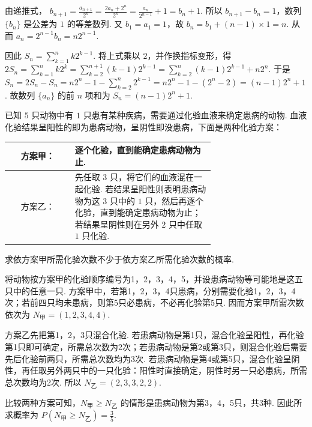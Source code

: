 \begin{solution}
由递推式，
\(
b_{n+1}=\frac{a_{n+1}}{2^n}=\frac{2a_n+2^n}{2^n}=\frac{a_n}{2^{n-1}}+1=b_n+1
\).
所以 \(b_{n+1}-b_n=1\)，数列 \(\{b_n\}\) 是公差为 \(1\) 的等差数列. 又 \(b_1=a_1=1\)，故
\(
b_n=b_1+(n-1)\times1=n
\).
从而
\(
a_n=2^{n-1}b_n=n2^{n-1}
\).

因此
\(
S_n=\sum_{k=1}^{n}k2^{k-1}
\).
将上式乘以 \(2\)，并作换指标变形，得
\(
2S_n=\sum_{k=1}^{n}k2^k=\sum_{k=2}^{n+1}(k-1)2^{k-1}=\sum_{k=2}^{n}(k-1)2^{k-1}+n2^n
\).
于是
\(
S_n=2S_n-S_n=n2^n-1-\sum_{k=2}^{n}2^{k-1}=n2^n-1-(2^n-2)=(n-1)2^n+1
\).
故数列 \(\{a_n\}\) 的前 \(n\) 项和为 \(S_n=(n-1)2^n+1\).
\end{solution}

\begin{problem}
已知 \(5\text{ 只}\)动物中有 \(1\text{ 只}\)患有某种疾病，需要通过化验血液来确定患病的动物. 血液化验结果呈阳性的即为患病动物，呈阴性即没患病，下面是两种化验方案：

\begin{center}
\begin{tabular}{|c|p{0.68\linewidth}|}
\hline
方案甲： & 逐个化验，直到能确定患病动物为止. \\
\hline
方案乙： & 先任取 \(3\text{ 只}\)，将它们的血液混在一起化验. 若结果呈阳性则表明患病动物为这 \(3\text{ 只}\)中的 \(1\text{ 只}\)，然后再逐个化验，直到能确定患病动物为止；若结果呈阴性则在另外 \(2\text{ 只}\)中任取 \(1\text{ 只}\)化验. \\
\hline
\end{tabular}
\end{center}

求依方案甲所需化验次数不少于依方案乙所需化验次数的概率.
\end{problem}

\begin{solution}
将动物按方案甲的化验顺序编号为1，2，3，4，5，并设患病动物等可能地是这五只中的任意一只. 方案甲中，若第1，2，3，4只患病，分别需要化验1，2，3，4次；若前四只均未患病，则第5只必患病，不必再化验第5只. 因而方案甲所需次数依次为
\(
N_{\text{甲}}=(1,2,3,4,4)
\).

方案乙先把第1，2，3只混合化验. 若患病动物是第1只，混合化验呈阳性，再化验第1只即可确定，所需总次数为2次；若患病动物是第2或第3只，则混合化验后需要先后化验前两只，所需总次数均为3次. 若患病动物是第4或第5只，混合化验呈阴性，再任取另外两只中的一只化验：阳性时直接确定，阴性时另一只必患病，所需总次数均为2次. 所以
\(
N_{\text{乙}}=(2,3,3,2,2)
\).

比较两种方案可知，\(N_{\text{甲}}\geqslant N_{\text{乙}}\) 的情形是患病动物为第3，4，5只，共3种. 因此所求概率为
\(
P\left(N_{\text{甲}}\geqslant N_{\text{乙}}\right)=\frac{3}{5}
\).
\end{solution}

